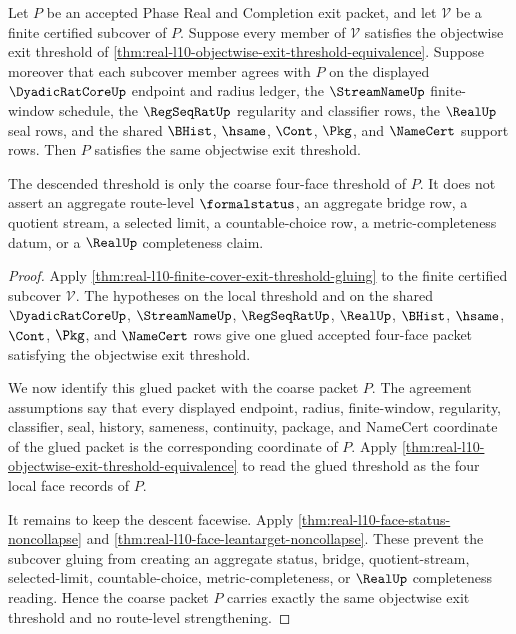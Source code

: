 \begin{theorem}
\label{thm:real-l10-finite-cover-exit-threshold-descent}
Let $P$ be an accepted Phase Real and Completion exit packet, and let
$\mathcal{V}$ be a finite certified subcover of $P$. Suppose every member of
$\mathcal{V}$ satisfies the objectwise exit threshold of
\autoref{thm:real-l10-objectwise-exit-threshold-equivalence}. Suppose moreover
that each subcover member agrees with $P$ on the displayed $\DyadicRatCoreUp$
endpoint and radius ledger, the $\StreamNameUp$ finite-window schedule, the
$\RegSeqRatUp$ regularity and classifier rows, the $\RealUp$ seal rows, and the
shared $\BHist$, $\hsame$, $\Cont$, $\Pkg$, and $\NameCert$ support rows. Then
$P$ satisfies the same objectwise exit threshold.

The descended threshold is only the coarse four-face threshold of $P$. It does
not assert an aggregate route-level $\formalstatus$, an aggregate bridge row, a
quotient stream, a selected limit, a countable-choice row, a
metric-completeness datum, or a $\RealUp$ completeness claim.
\end{theorem}
\begin{proof}
Apply \autoref{thm:real-l10-finite-cover-exit-threshold-gluing} to the finite
certified subcover $\mathcal{V}$. The hypotheses on the local threshold and on
the shared $\DyadicRatCoreUp$, $\StreamNameUp$, $\RegSeqRatUp$, $\RealUp$,
$\BHist$, $\hsame$, $\Cont$, $\Pkg$, and $\NameCert$ rows give one glued
accepted four-face packet satisfying the objectwise exit threshold.

We now identify this glued packet with the coarse packet $P$. The agreement
assumptions say that every displayed endpoint, radius, finite-window,
regularity, classifier, seal, history, sameness, continuity, package, and
NameCert coordinate of the glued packet is the corresponding coordinate of
$P$. Apply \autoref{thm:real-l10-objectwise-exit-threshold-equivalence} to read
the glued threshold as the four local face records of $P$.

It remains to keep the descent facewise. Apply
\autoref{thm:real-l10-face-status-noncollapse} and
\autoref{thm:real-l10-face-leantarget-noncollapse}. These prevent the
subcover gluing from creating an aggregate status, bridge, quotient-stream,
selected-limit, countable-choice, metric-completeness, or $\RealUp$
completeness reading. Hence the coarse packet $P$ carries exactly the same
objectwise exit threshold and no route-level strengthening.
\end{proof}

